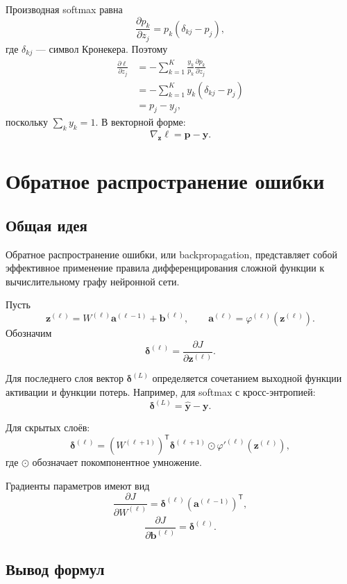 \documentclass[12pt,a4paper]{article}
\theoremstyle{definition}
\newcommand{\T}{\mathsf{T}}
\newcommand{\1}{\mathbf{1}}
\begin{document}
Производная softmax равна
\[
    \frac{\partial p_k}{\partial z_j}
    =
    p_k(\delta_{kj}-p_j),
\]
где $\delta_{kj}$ --- символ Кронекера. Поэтому
\begin{align*}
    \frac{\partial\ell}{\partial z_j}
    &=
    -\sum_{k=1}^{K}
    \frac{y_k}{p_k}
    \frac{\partial p_k}{\partial z_j}\\
    &=
    -\sum_{k=1}^{K}y_k(\delta_{kj}-p_j)\\
    &=
    p_j-y_j,
\end{align*}
поскольку $\sum_k y_k=1$. В векторной форме:
\[
    \nabla_{\bm{z}}\ell
    =
    \bm{p}-\bm{y}.
\]

\section{Обратное распространение ошибки}

\subsection{Общая идея}

Обратное распространение ошибки, или backpropagation, представляет
собой эффективное применение правила дифференцирования сложной функции
к вычислительному графу нейронной сети.

Пусть
\[
    \bm{z}^{(\ell)}
    =
    W^{(\ell)}\bm{a}^{(\ell-1)}
    +
    \bm{b}^{(\ell)},
    \qquad
    \bm{a}^{(\ell)}
    =
    \varphi^{(\ell)}(\bm{z}^{(\ell)}).
\]
Обозначим
\[
    \bm{\delta}^{(\ell)}
    =
    \frac{\partial J}{\partial\bm{z}^{(\ell)}}.
\]

Для последнего слоя вектор $\bm{\delta}^{(L)}$ определяется сочетанием
выходной функции активации и функции потерь. Например, для softmax
с кросс-энтропией:
\[
    \bm{\delta}^{(L)}
    =
    \widehat{\bm{y}}-\bm{y}.
\]

Для скрытых слоёв:
\[
    \bm{\delta}^{(\ell)}
    =
    \left(W^{(\ell+1)}\right)^{\T}
    \bm{\delta}^{(\ell+1)}
    \odot
    \varphi'^{(\ell)}(\bm{z}^{(\ell)}),
\]
где $\odot$ обозначает покомпонентное умножение.

Градиенты параметров имеют вид
\[
    \frac{\partial J}{\partial W^{(\ell)}}
    =
    \bm{\delta}^{(\ell)}
    \left(\bm{a}^{(\ell-1)}\right)^{\T},
\]
\[
    \frac{\partial J}{\partial\bm{b}^{(\ell)}}
    =
    \bm{\delta}^{(\ell)}.
\]

\subsection{Вывод формул}
\end{document}
